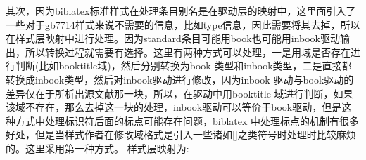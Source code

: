\begin{enumerate}
    其次，因为biblatex标准样式在处理条目别名是在驱动层的映射中，这里面引入了一些对于gb7714样式来说不需要的信息，比如type信息，因此需要将其去掉，所以在样式层映射中进行处理。因为standard条目可能用book也可能用inbook驱动输出，所以转换过程就需要有选择。这里有两种方式可以处理，一是用域是否存在进行判断(比如booktitle域)，然后分别转换为book 类型和inbook类型，二是直接都转换成inbook类型，然后对inbook驱动进行修改，因为inbook 驱动与book驱动的差异仅在于所析出源文献那一块，所以，在驱动中用booktitle 域进行判断，如果该域不存在，那么去掉这一块的处理，inbook驱动可以等价于book驱动，但是这种方式中处理标识符后面的标点可能存在问题，biblatex 中处理标点的机制有很多好处，但是当样式作者在修改域格式是引入一些诸如[]之类符号时处理时比较麻烦的。这里采用第一种方式。
    样式层映射为:
    \begin{texlist}
    \DeclareStyleSourcemap{
        \maps[datatype=bibtex]{
            \map{%
            \step[fieldsource=booktitle,final]%
            \step[typesource=standard, typetarget=inbook, final]
            }
            \map{%
            \step[typesource=standard, typetarget=book, final]%
            }
            \map{%
            \step[typesource=mastersthesis, typetarget=thesis, final]
            }
            \map{%
            \step[typesource=phdthesis, typetarget=thesis, final]
            }
            \map{%
            \step[typesource=techreport, typetarget=report, final]
            }
        }
    }
    \end{texlist}


\end{enumerate}
